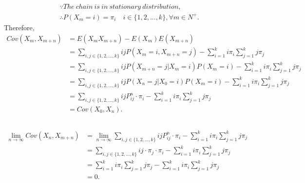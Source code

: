 \documentclass{article}
\begin{document}
\subsection{}
\begin{align*}
    &\because The\ chain\ is\ in\ stationary\ distribution, \\
    &\therefore P(X_m=i)=\pi_i \quad i \in \{1, 2, ...,k\}, \forall m \in N^+. 
\end{align*}
Therefore, 
\begin{align*}
    Cov(X_m, X_{m+n}) &= E(X_mX_{m+n})-E(X_m)E(X_{m+n}) \\
    &= \sum_{i,j \in \{1,2,...,k\}} ijP(X_m=i,X_{m+n}=j)-\sum_{i=1}^k i\pi_i \sum_{j=1}^k j\pi_j \\
    &= \sum_{i,j \in \{1,2,...,k\}} ijP(X_{m+n}=j|X_m=i)P(X_m=i)-\sum_{i=1}^k i\pi_i \sum_{j=1}^k j\pi_j \\
    &=\sum_{i,j \in \{1,2,...,k\}} ijP(X_{n}=j|X_0=i)P(X_m=i)-\sum_{i=1}^k i\pi_i \sum_{j=1}^k j\pi_j\\
    &= \sum_{i,j \in \{1,2,...,k\}} ijP_{ij}^n \cdot \pi_i - \sum_{i=1}^k i\pi_i \sum_{j=1}^k j\pi_j\\
    &= Cov(X_0, X_n). 
\end{align*}
\subsection{}
\begin{align*}
    \lim\limits_{n\to \infty} Cov(X_n, X_{m+n}) &= \lim\limits_{n\to \infty} \sum_{i,j \in \{1,2,...,k\}} ijP_{ij}^n \cdot \pi_i - \sum_{i=1}^k i\pi_i \sum_{j=1}^k j\pi_j \\
    &=\sum_{i,j \in \{1,2,...,k\}} ij\cdot \pi_j \cdot \pi_i - \sum_{i=1}^k i\pi_i \sum_{j=1}^k j\pi_j \\
    &=\sum_{i=1}^k i\pi_i \sum_{j=1}^k j\pi_j-\sum_{i=1}^k i\pi_i \sum_{j=1}^k j\pi_j \\
    &=0.
\end{align*}
\end{document}
